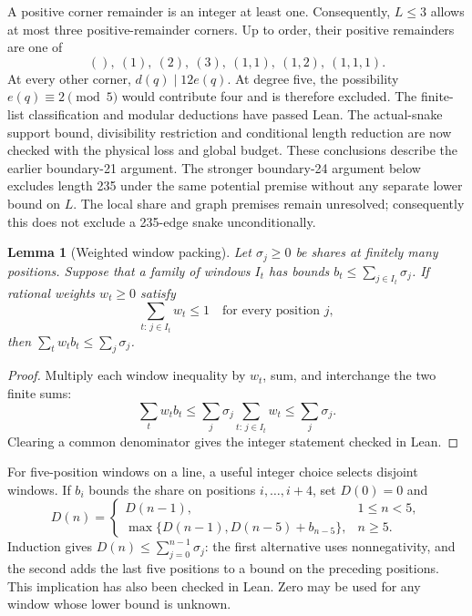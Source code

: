 \documentclass[11pt,a4paper]{article}
\newtheorem{lemma}[theorem]{Lemma}
\theoremstyle{definition}
\theoremstyle{remark}
\begin{document}
A positive corner remainder is an integer at least one. Consequently,
$L\le3$ allows at most three positive-remainder corners. Up to order,
their positive remainders are one of
\[
(),\ (1),\ (2),\ (3),\ (1,1),\ (1,2),\ (1,1,1).
\]
At every other corner, $d(q)\mid12e(q)$. At degree five, the possibility
$e(q)\equiv2\pmod5$ would contribute four and is therefore excluded.
The finite-list classification and modular deductions have passed Lean.
The actual-snake support bound, divisibility restriction and conditional
length reduction are now checked with the physical loss and global budget.
These conclusions describe the earlier boundary-21 argument. The stronger
boundary-24 argument below excludes length 235 under the same potential
premise without any separate lower bound on $L$. The local share and graph
premises remain unresolved; consequently this does not exclude a
235-edge snake unconditionally.

\begin{lemma}[Weighted window packing]\label{lem:share-packing}
Let $\sigma_j\ge0$ be shares at finitely many positions. Suppose that a family of windows $I_t$ has bounds $b_t\le\sum_{j\in I_t}\sigma_j$. If rational weights $w_t\ge0$ satisfy
\[
\sum_{t:\,j\in I_t}w_t\le1\quad\text{for every position }j,
\]
then $\sum_t w_t b_t\le\sum_j\sigma_j$.
\end{lemma}
\begin{proof}
Multiply each window inequality by $w_t$, sum, and interchange the two finite sums:
\[
\sum_t w_t b_t\le\sum_j\sigma_j\sum_{t:\,j\in I_t}w_t\le\sum_j\sigma_j.
\]
Clearing a common denominator gives the integer statement checked in Lean.
\end{proof}
For five-position windows on a line, a useful integer choice selects disjoint windows. If $b_i$ bounds the share on positions $i,\ldots,i+4$, set $D(0)=0$ and
\[
D(n)=
\begin{cases}
D(n-1),&1\le n<5,\\
\max\{D(n-1),D(n-5)+b_{n-5}\},&n\ge5.
\end{cases}
\]
Induction gives $D(n)\le\sum_{j=0}^{n-1}\sigma_j$: the first alternative uses nonnegativity, and the second adds the last five positions to a bound on the preceding positions. This implication has also been checked in Lean. Zero may be used for any window whose lower bound is unknown.
\end{document}
